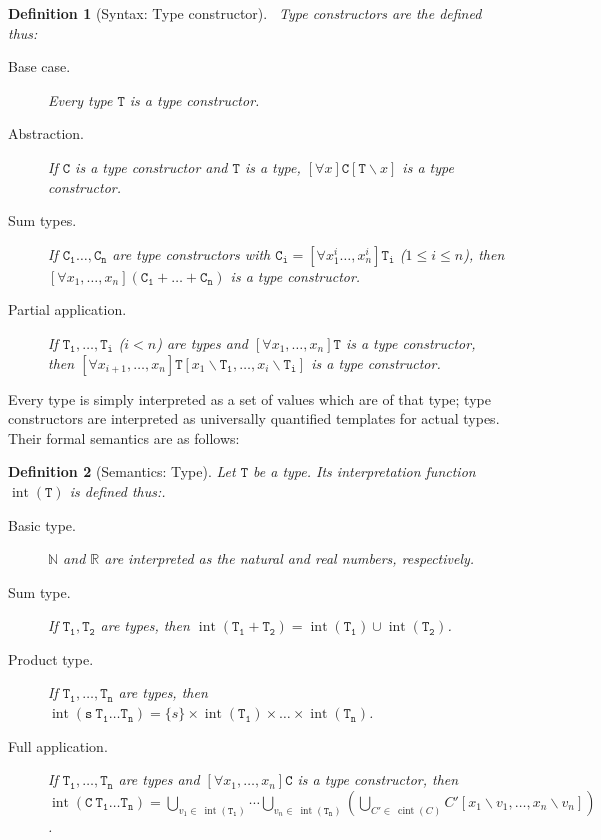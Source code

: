 \documentclass[]{scrartcl}
\theoremstyle{break}
\newtheorem{definition}{Definition}
\newcommand{\N}{\mathbb{N}}
\newcommand{\R}{\mathbb{R}}
\newcommand{\allQ}[1]{\left[\forall #1 \right]}
\DeclareMathOperator{\tint}{int}
\newcommand{\type}[1]{\mathtt{#1}}
\DeclareMathOperator{\cint}{cint}
\newcommand{\lp}{{\rm (}}
\newcommand{\rp}{{\rm )}}
\newcommand{\paren}[1]{\lp{#1}\rp}
\begin{document}
\begin{definition}[Syntax: Type constructor]\label{def:typeCon}\
	Type constructors are the defined thus:
	\begin{description}
		\item[Base case.] Every type $\type{T}$ is a type constructor.
		\item[Abstraction.] If $\type{C}$ is a type constructor and $\type{T}$ is a type, $\allQ{x} \type{C}[\type{T}\backslash x]$ is a type constructor.
		\item[Sum types.] If $\type{C_1}\dots,\type{C_n}$ are type constructors with $\type{C_i} = \allQ{x^i_1\dots,x^i_n} \type{T_i}$ \paren{$1 \leq i \leq n$}, then\\ $\allQ{x_1,\dots,x_n} (\type{C_1} + \dots + \type{C_n})$ is a type constructor.
		\item[Partial application.] If $\type{T_1},\dots,\type{T_i}$ \paren{$i < n$} are types and $\allQ{x_1,\dots,x_n} \type{T}$ is a type constructor,\\ then $\allQ{x_{i+1},\dots,x_n} \type{T}[x_1\backslash \type{T_1},\dots,x_i\backslash \type{T_i}]$ is a type constructor.
	\end{description}
\end{definition}

Every type is simply interpreted as a set of values which are of that type; type constructors are interpreted as universally quantified templates for actual types. Their formal semantics are as follows:

\begin{definition}[Semantics: Type]\label{def:typeSem}
Let $\type{T}$ be a type. Its interpretation function $\tint(\type{T})$ is defined thus:.
	\begin{description}
		\item[Basic type.] $\N$ and $\R$ are interpreted as the natural and real numbers, respectively.
		\item[Sum type.] If $\type{T_1}, \type{T_2}$ are types, then $\tint(\type{T_1 + T_2}) = \tint(\type{T_1}) \cup \tint(\type{T_2})$.
		\item[Product type.] If $\type{T_1},\dots,\type{T_n}$ are types, then $\tint(\type{s}\ \type{T_1} \dots \type{T_n}) = \{s\} \times \tint(\type{T_1}) \times \dots \times \tint(\type{T_n})$.
		\item[Full application.] If $\type{T_1},\dots,\type{T_n}$ are types and $\allQ{x_1,\dots,x_n} \type{C}$ is a type constructor, then\\$\tint(\type{C}\ \type{T_1} \dots \type{T_n}) = \bigcup\limits_{v_1 \in\ \tint(\type{T_1})} \cdots \bigcup\limits_{v_n \in\ \tint(\type{T_n})} \left( \bigcup\limits_{C' \in\ \cint(C)} C'[x_1\backslash v_1,\dots, x_n\backslash v_n] \right)$.
	\end{description}
\end{definition}
\end{document}
